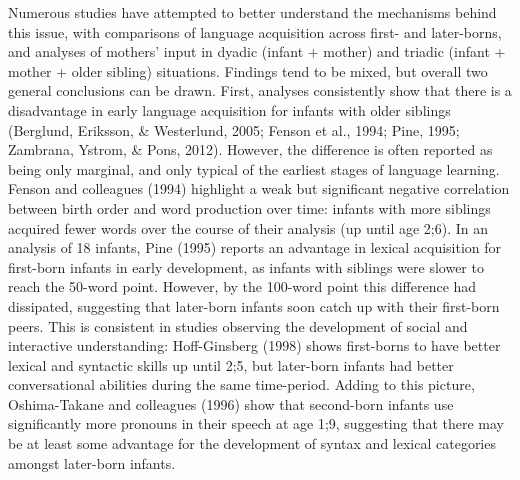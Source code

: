 \documentclass[man,floatsintext]{apa6}
\begin{document}
Numerous studies have attempted to better understand the mechanisms behind this issue, with comparisons of language acquisition across first- and later-borns, and analyses of mothers' input in dyadic (infant + mother) and triadic (infant + mother + older sibling) situations. Findings tend to be mixed, but overall two general conclusions can be drawn. First, analyses consistently show that there is a disadvantage in early language acquisition for infants with older siblings (Berglund, Eriksson, \& Westerlund, 2005; Fenson et al., 1994; Pine, 1995; Zambrana, Ystrom, \& Pons, 2012). However, the difference is often reported as being only marginal, and only typical of the earliest stages of language learning. Fenson and colleagues (1994) highlight a weak but significant negative correlation between birth order and word production over time: infants with more siblings acquired fewer words over the course of their analysis (up until age 2;6). In an analysis of 18 infants, Pine (1995) reports an advantage in lexical acquisition for first-born infants in early development, as infants with siblings were slower to reach the 50-word point. However, by the 100-word point this difference had dissipated, suggesting that later-born infants soon catch up with their first-born peers. This is consistent in studies observing the development of social and interactive understanding: Hoff-Ginsberg (1998) shows first-borns to have better lexical and syntactic skills up until 2;5, but later-born infants had better conversational abilities during the same time-period. Adding to this picture, Oshima-Takane and colleagues (1996) show that second-born infants use significantly more pronouns in their speech at age 1;9, suggesting that there may be at least some advantage for the development of syntax and lexical categories amongst later-born infants.
\end{document}
